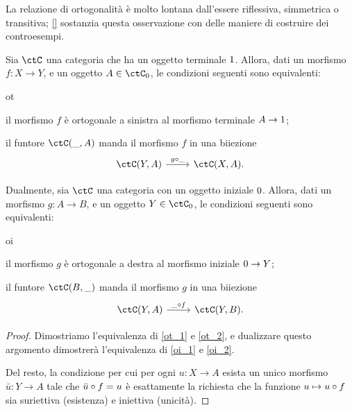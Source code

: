 La relazione di ortogonalità è molto lontana dall'essere riflessiva, simmetrica o transitiva; \ref{} sostanzia questa osservazione con delle maniere di costruire dei controesempi.
\begin{proposition}\label{ort_to_terminale}
	Sia \(\ctC\) una categoria che ha un oggetto terminale \(1\). Allora, dati un morfismo \(f : X\to Y\), e un oggetto \(A\in \ctC_0\), le condizioni seguenti sono equivalenti:
	\begin{enumtag}{ot}
		\item\label{ot_1} il morfismo \(f\) è ortogonale a sinistra al morfismo terminale \(A\to 1\);
		\item\label{ot_2} il funtore \(\Hom{\ctC}(\_,A)\) manda il morfismo \(f\) in una biiezione
		\[\begin{tikzcd}
				\Hom{\ctC}(Y,A) \ar[r, "{g\cmp \_}"] & \Hom{\ctC}(X,A).
			\end{tikzcd}\]
	\end{enumtag}
	Dualmente, sia \(\ctC\) una categoria con un oggetto iniziale \(0\). Allora, dati un morfismo \(g : A\to B\), e un oggetto \(Y\in\ctC_0\), le condizioni seguenti sono equivalenti:
	\begin{enumtag}{oi}
		\item \label{oi_1} il morfismo \(g\) è ortogonale a destra al morfismo iniziale \(0\to Y\);
		\item \label{oi_2} il funtore \(\Hom{\ctC}(B,\_)\) manda il morfismo \(g\) in una biiezione
		\[\begin{tikzcd}
				\Hom{\ctC}(Y,A) \ar[r, "{\_\cmp f}"] & \Hom{\ctC}(Y,B).
			\end{tikzcd}\]
	\end{enumtag}
\end{proposition}
\begin{proof}
	Dimostriamo l'equivalenza di \ref{ot_1} e \ref{ot_2}, e dualizzare questo argomento dimostrerà l'equivalenza di \ref{oi_1} e \ref{oi_2}.

	Del resto, la condizione per cui per ogni \(u : X\to A\) esista un unico morfismo \(\bar u : Y\to A\) tale che \(\bar u\circ f = u\) è esattamente la richiesta che la funzione \(u\mapsto u\circ f\) sia suriettiva (esistenza) e iniettiva (unicità).
\end{proof}
